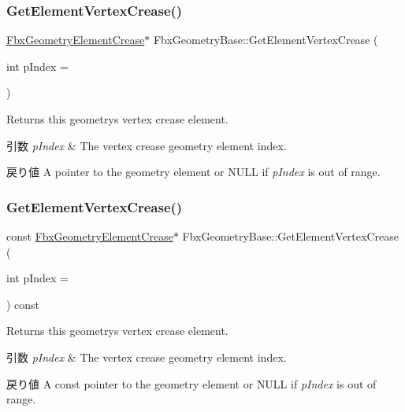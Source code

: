 \subsubsection{\texorpdfstring{Get\+Element\+Vertex\+Crease()}{GetElementVertexCrease()}\hspace{0.1cm}{\footnotesize\ttfamily [1/2]}}
{\footnotesize\ttfamily \hyperlink{fbxlayer_8h_aa1db71d39153856548f192cf52aa2cc5}{Fbx\+Geometry\+Element\+Crease}$\ast$ Fbx\+Geometry\+Base\+::\+Get\+Element\+Vertex\+Crease (\begin{DoxyParamCaption}\item[{int}]{p\+Index = {} }\end{DoxyParamCaption})}

Returns this geometry\textquotesingle{}s vertex crease element. 
\begin{DoxyParams}{引数}
{\em p\+Index} & The vertex crease geometry element index. \\
\hline
\end{DoxyParams}
\begin{DoxyReturn}{戻り値}
A pointer to the geometry element or {\ttfamily N\+U\+LL} if {\itshape p\+Index} is out of range. 
\end{DoxyReturn}
\mbox{\label{class_fbx_geometry_base_aa54ec0641f415576fd7e09753df8fa0d}} 
\subsubsection{\texorpdfstring{Get\+Element\+Vertex\+Crease()}{GetElementVertexCrease()}\hspace{0.1cm}{\footnotesize\ttfamily [2/2]}}
{\footnotesize\ttfamily const \hyperlink{fbxlayer_8h_aa1db71d39153856548f192cf52aa2cc5}{Fbx\+Geometry\+Element\+Crease}$\ast$ Fbx\+Geometry\+Base\+::\+Get\+Element\+Vertex\+Crease (\begin{DoxyParamCaption}\item[{int}]{p\+Index = {} }\end{DoxyParamCaption}) const}

Returns this geometry\textquotesingle{}s vertex crease element. 
\begin{DoxyParams}{引数}
{\em p\+Index} & The vertex crease geometry element index. \\
\hline
\end{DoxyParams}
\begin{DoxyReturn}{戻り値}
A const pointer to the geometry element or {\ttfamily N\+U\+LL} if {\itshape p\+Index} is out of range. 
\end{DoxyReturn}
\mbox{\label{class_fbx_geometry_base_afc099f60d6c45cbac000b10d95c83377}} 
